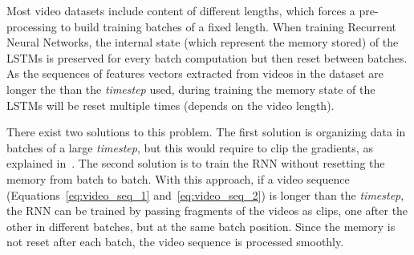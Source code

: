 Most video datasets include content of different lengths, which forces a pre-processing to build training batches of a fixed length.
When training Recurrent Neural Networks, the internal state (which represent the memory stored) of the LSTMs is preserved for every batch computation but then reset between batches. As the sequences of features vectors extracted from videos in the dataset are longer the than the \textit{timestep} used, during training the memory state of the LSTMs will be reset multiple times (depends on the video length).




There exist two solutions to this problem. The first solution is organizing data in batches of a large \textit{timestep}, but this would require to clip the gradients, as explained in~\cite{pascanu2012difficulty}. The second solution is to train the RNN without resetting the memory from batch to batch. With this approach, if a video sequence (Equations~\ref{eq:video_seq_1} and~\ref{eq:video_seq_2}) is longer than the \textit{timestep}, the RNN can be trained by passing fragments of the videos as clips, one after the other in different batches, but at the same batch position. Since the memory is not reset after each batch, the video sequence is processed smoothly.

